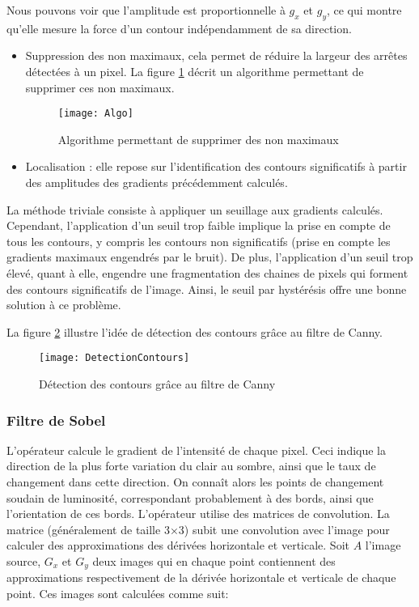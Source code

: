 Nous pouvons voir que l’amplitude est proportionnelle à $g_x$ et $g_y$, ce qui montre qu’elle mesure la force d’un contour indépendamment de sa direction. 
\begin{itemize}[label=\textbullet,font=\color{black}]
\item Suppression des non maximaux, cela permet de réduire la largeur des arrêtes détectées à un pixel. La figure \ref{fig:Algo} décrit un algorithme permettant de supprimer ces non maximaux.
\begin{figure}[h]
  \centering
  \texttt{[image: Algo]}
  \caption{Algorithme permettant de supprimer des non maximaux}
  \label{fig:Algo}
\end{figure}
\item Localisation : elle repose sur l’identification des contours significatifs à partir des amplitudes des gradients précédemment calculés. 
\end{itemize}

La méthode triviale consiste à appliquer un seuillage aux gradients calculés. Cependant, l’application d’un seuil trop faible implique la prise en compte de tous les contours, y compris les contours non significatifs (prise en compte les gradients maximaux engendrés par le bruit). De plus, l’application d’un seuil trop élevé, quant à elle, engendre une fragmentation des chaines de pixels qui forment des contours significatifs  de l’image. Ainsi, le seuil par hystérésis offre une bonne solution à ce problème. 

La figure \ref{fig:DetectionContours} illustre l’idée de détection des contours grâce au filtre de Canny.
\begin{figure}[H]
  \centering
  \texttt{[image: DetectionContours]}
  \caption{Détection des contours grâce au filtre de Canny}
  \label{fig:DetectionContours}
\end{figure}

\subsubsection*{Filtre de Sobel}

L'opérateur calcule le gradient de l'intensité de chaque pixel. Ceci indique la direction de la plus forte variation du clair au sombre, ainsi que le taux de changement dans cette direction. On connaît alors les points de changement soudain de luminosité, correspondant probablement à des bords, ainsi que l'orientation de ces bords.
L'opérateur utilise des matrices de convolution. La matrice (généralement de taille 3×3) subit une convolution avec l'image pour calculer des approximations des dérivées horizontale et verticale. Soit $A$ l'image source, $G_x$ et $G_y$ deux images qui en chaque point contiennent des approximations respectivement de la dérivée horizontale et verticale de chaque point. Ces images sont calculées comme suit:

